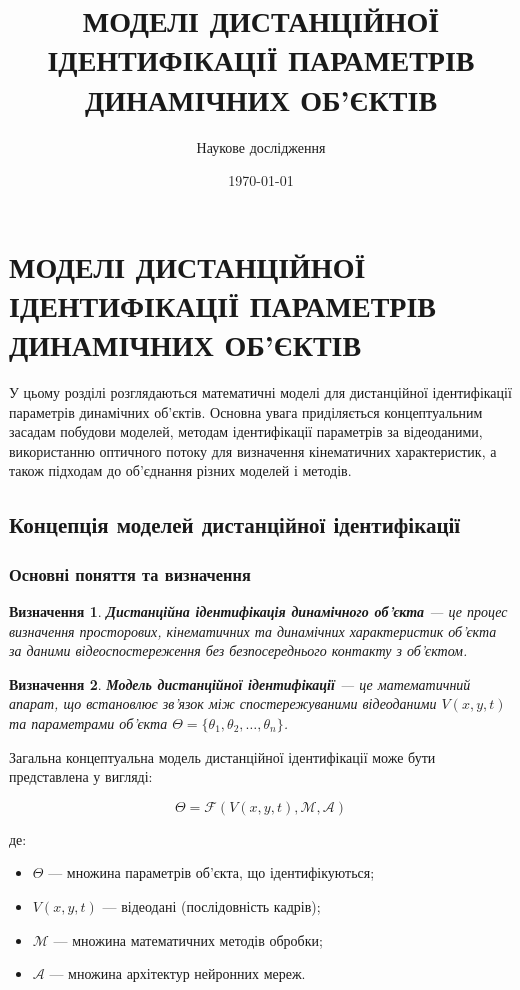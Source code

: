 \documentclass[14pt, a4paper]{extarticle}
\title{МОДЕЛІ ДИСТАНЦІЙНОЇ ІДЕНТИФІКАЦІЇ ПАРАМЕТРІВ ДИНАМІЧНИХ ОБ'ЄКТІВ}
\author{Наукове дослідження}
\date{\today}
\numberwithin{equation}{section}
\newtheorem{definition}{Визначення}[section]
\begin{document}
\maketitle

\tableofcontents

\newpage

\section{МОДЕЛІ ДИСТАНЦІЙНОЇ ІДЕНТИФІКАЦІЇ ПАРАМЕТРІВ ДИНАМІЧНИХ ОБ'ЄКТІВ}

У цьому розділі розглядаються математичні моделі для дистанційної ідентифікації параметрів динамічних об'єктів. Основна увага приділяється концептуальним засадам побудови моделей, методам ідентифікації параметрів за відеоданими, використанню оптичного потоку для визначення кінематичних характеристик, а також підходам до об'єднання різних моделей і методів.

\subsection{Концепція моделей дистанційної ідентифікації}

\subsubsection{Основні поняття та визначення}

\begin{definition}
\textbf{Дистанційна ідентифікація динамічного об'єкта} — це процес визначення просторових, кінематичних та динамічних характеристик об'єкта за даними відеоспостереження без безпосереднього контакту з об'єктом.
\end{definition}

\begin{definition}
\textbf{Модель дистанційної ідентифікації} — це математичний апарат, що встановлює зв'язок між спостережуваними відеоданими $V(x,y,t)$ та параметрами об'єкта $\Theta = \{\theta_1, \theta_2, \ldots, \theta_n\}$.
\end{definition}

Загальна концептуальна модель дистанційної ідентифікації може бути представлена у вигляді:

\begin{equation}
\boxed{\Theta = \mathcal{F}(V(x,y,t), \mathcal{M}, \mathcal{A})} \tag{3.1}
\end{equation}

де:
\begin{itemize}
\item $\Theta$ — множина параметрів об'єкта, що ідентифікуються;
\item $V(x,y,t)$ — відеодані (послідовність кадрів);
\item $\mathcal{M}$ — множина математичних методів обробки;
\item $\mathcal{A}$ — множина архітектур нейронних мереж.
\end{itemize}
\end{document}
